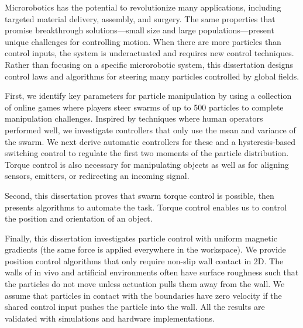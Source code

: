 


Microrobotics has the potential to revolutionize many applications, including targeted material delivery, assembly, and surgery.  The same properties that promise breakthrough solutions---small size and large populations---present unique challenges for controlling motion. 
 When there are more particles than control inputs, the system is underactuated and requires new control techniques.
 Rather than focusing on a specific microrobotic system, this dissertation designs control laws and algorithms for steering many particles controlled by global fields.

 
 First, we identify key parameters for particle manipulation by using a collection of online games where players steer swarms of up to 500 particles to complete manipulation challenges. Inspired by techniques where human operators performed well, we investigate controllers that only use the mean and variance of the swarm. We next derive automatic controllers for these and a hysteresis-based switching control to regulate the first two moments of the particle distribution. Torque control is also necessary for manipulating objects as well as for aligning sensors, emitters, or redirecting an incoming signal. 
 
 Second, this dissertation proves that swarm torque control is possible, then presents algorithms to automate the task. Torque control enables us to control the position and orientation of an object.
 
 Finally, this dissertation investigates particle control with uniform magnetic gradients (the same force is applied everywhere in the workspace).
 We provide position control algorithms that only require non-slip wall contact in 2D.
 The walls of in vivo and artificial environments often have surface roughness such that the particles do not move unless actuation pulls them away from the wall.
We assume that particles in contact with the boundaries have zero velocity if the shared control input pushes the particle into the wall. 
All the results are validated with simulations and hardware implementations.

